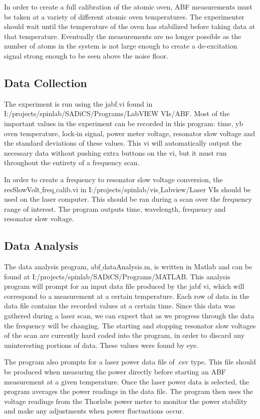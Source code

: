 \documentclass[12pt, a4paper]{article}
\begin{document}
In order to create a full calibration of the atomic oven, ABF measurements must be taken at a variety of different atomic oven temperatures. The experimenter should wait until the temperature of the oven has stabilized before taking data at that temperature. Eventually the measurements are no longer possible as the number of atoms in the system is not large enough to create a de-excitation signal strong enough to be seen above the noise floor. 

\subsection{Data Collection}
The experiment is run using the jabf.vi found in I:/projects/spinlab/SADiCS/Programs/LabVIEW VIs/ABF. Most of the important values in the experiment can be recorded in this program: time, yb oven temperature, lock-in signal, power meter voltage, resonator slow voltage and the standard deviations of these values. This vi will automatically output the necessary data without pushing extra buttons on the vi, but it must run throughout the entirety of a frequency scan. 

In order to create a frequency to resonator slow voltage conversion, the resSlowVolt$\_$freq$\_$calib.vi in I:/projects/spinlab/vis$\_$Labview/Laser VIs should be used on the laser computer. This should be ran during a scan over the frequency range of interest. The program outputs time, wavelength, frequency and resonator slow voltage.  

\subsection{Data Analysis}
The data analysis program, abf$\_$dataAnalysis.m,  is written in Matlab and can be found at I:/projects/spinlab/SADiCS/Programs/MATLAB. This analysis program will prompt for an input data file produced by the jabf vi, which will correspond to a measurement at a certain temperature. Each row of data in the data file contains the recorded values at a certain time. Since this data was gathered during a laser scan, we can expect that as we progress through the data the frequency will be changing. The starting and stopping resonator slow voltages of the scan are currently hard coded into the program, in order to discard any uninteresting portions of data. These values were found by eye. 

The program also prompts for a laser power data file of .csv type. This file should be produced when measuring the power directly before starting an ABF measurement at a given temperature. Once the laser power data is selected, the program averages the power readings in the data file. The program then uses the voltage readings from the Thorlabs power meter to monitor the power stability and make any adjustments when power fluctuations occur. 
\end{document}
